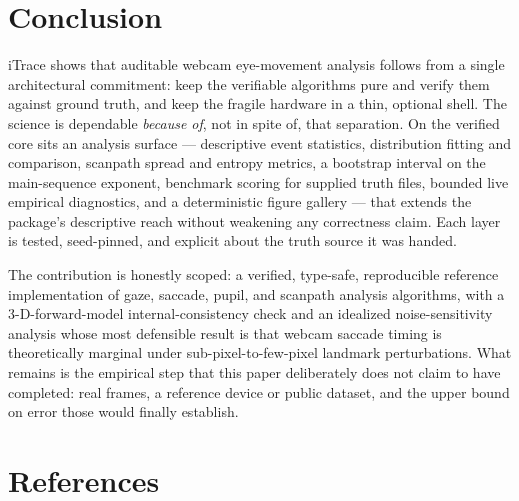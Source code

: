\documentclass[
]{article}
\begin{document}
\section{Conclusion}\label{sec:conclusion}

iTrace shows that auditable webcam eye-movement analysis follows from a
single architectural commitment: keep the verifiable algorithms pure and
verify them against ground truth, and keep the fragile hardware in a
thin, optional shell. The science is dependable \emph{because of}, not
in spite of, that separation. On the verified core sits an analysis
surface --- descriptive event statistics, distribution fitting and
comparison, scanpath spread and entropy metrics, a bootstrap interval on
the main-sequence exponent, benchmark scoring for supplied truth files,
bounded live empirical diagnostics, and a deterministic figure gallery
--- that extends the package's descriptive reach without weakening any
correctness claim. Each layer is tested, seed-pinned, and explicit about
the truth source it was handed.

The contribution is honestly scoped: a verified, type-safe, reproducible
reference implementation of gaze, saccade, pupil, and scanpath analysis
algorithms, with a 3-D-forward-model internal-consistency check and an
idealized noise-sensitivity analysis whose most defensible result is
that webcam saccade timing is theoretically marginal under
sub-pixel-to-few-pixel landmark perturbations. What remains is the
empirical step that this paper deliberately does not claim to have
completed: real frames, a reference device or public dataset, and the
upper bound on error those would finally establish.

\section{References}\label{sec:references}
\end{document}
